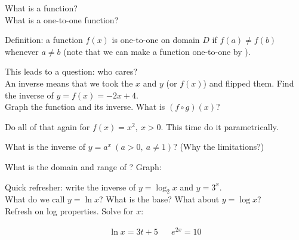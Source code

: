 \documentclass[11pt]{article}
\begin{document}
    \noindent What is a function?\\[2ex]

    \noindent What is a one-to-one function?

    \noindent Definition: a function $\displaystyle f(x)$ is one-to-one on domain $\displaystyle D$ if $\displaystyle f(a) \neq f(b)$ whenever $\displaystyle a \neq b$ (note that we can make a function one-to-one by \underline{\hspace{2cm}}).

    \noindent This leads to a question: who cares?\\[2ex]

    \noindent An inverse means that we took the $\displaystyle x$ and $\displaystyle y$ (or $\displaystyle f(x)$) and flipped them. Find the inverse of $\displaystyle y = f(x) = -2x + 4$.\\[2ex]

    \noindent Graph the function and its inverse. What is $\displaystyle (f \circ g)(x)$?

    \emptygraph

    \noindent Do all of that again for $\displaystyle f(x) = x^2,\ x > 0$. This time do it parametrically.

    \emptygraph

    \vspace{2ex}

    \noindent What is the inverse of $\displaystyle y=a^x\ (a > 0,\ a \neq 1)$? (Why the limitations?)\\[2ex]

    \newpage

    \noindent What is the domain and range of \underline{\hspace{3cm}}? Graph:

    \emptygraph

    \noindent Quick refresher: write the inverse of $\displaystyle y = \log_2 x$ and $\displaystyle y = 3^x$.\\[2ex]

    \noindent What do we call $\displaystyle y = \ln x$? What is the base? What about $\displaystyle y = \log x$?\\[2ex]

    \noindent Refresh on log properties. Solve for $\displaystyle x$:

    \begin{align*}
        \ln x = 3t + 5 &  & e^{2x} = 10
    \end{align*}
\end{document}
